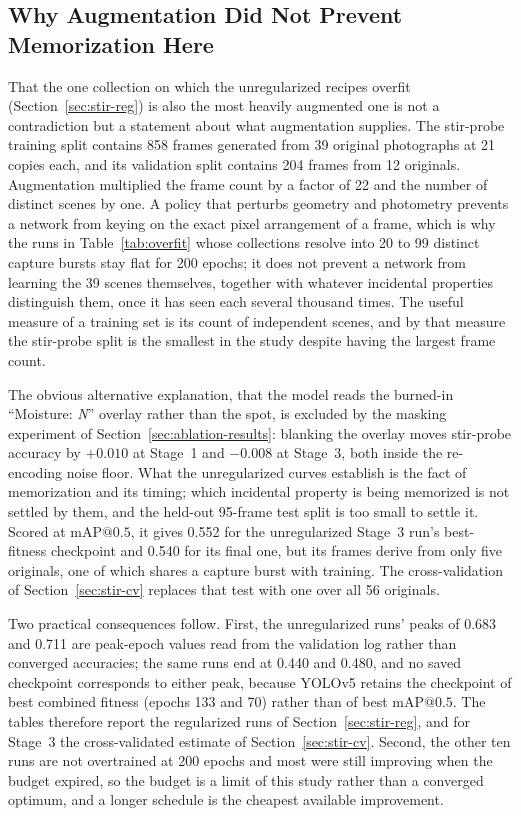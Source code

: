 ﻿\documentclass[journal]{IEEEtran}
\begin{document}
\subsection{Why Augmentation Did Not Prevent Memorization Here}
\label{sec:aug-limits}
That the one collection on which the unregularized recipes overfit (Section~\ref{sec:stir-reg}) is also the most heavily augmented one is not a contradiction but a statement about what augmentation supplies. The stir-probe training split contains 858 frames generated from 39 original photographs at 21 copies each, and its validation split contains 204 frames from 12 originals. Augmentation multiplied the frame count by a factor of 22 and the number of distinct scenes by one. A policy that perturbs geometry and photometry prevents a network from keying on the exact pixel arrangement of a frame, which is why the runs in Table~\ref{tab:overfit} whose collections resolve into 20 to 99 distinct capture bursts stay flat for 200 epochs; it does not prevent a network from learning the 39 scenes themselves, together with whatever incidental properties distinguish them, once it has seen each several thousand times. The useful measure of a training set is its count of independent scenes, and by that measure the stir-probe split is the smallest in the study despite having the largest frame count.

The obvious alternative explanation, that the model reads the burned-in ``Moisture: \emph{N}'' overlay rather than the spot, is excluded by the masking experiment of Section~\ref{sec:ablation-results}: blanking the overlay moves stir-probe accuracy by $+0.010$ at Stage~1 and $-0.008$ at Stage~3, both inside the re-encoding noise floor. What the unregularized curves establish is the fact of memorization and its timing; which incidental property is being memorized is not settled by them, and the held-out 95-frame test split is too small to settle it. Scored at $\text{mAP@0.5}$, it gives 0.552 for the unregularized Stage~3 run's best-fitness checkpoint and 0.540 for its final one, but its frames derive from only five originals, one of which shares a capture burst with training. The cross-validation of Section~\ref{sec:stir-cv} replaces that test with one over all 56 originals.

Two practical consequences follow. First, the unregularized runs' peaks of 0.683 and 0.711 are peak-epoch values read from the validation log rather than converged accuracies; the same runs end at 0.440 and 0.480, and no saved checkpoint corresponds to either peak, because YOLOv5 retains the checkpoint of best combined fitness (epochs 133 and 70) rather than of best $\text{mAP@0.5}$. The tables therefore report the regularized runs of Section~\ref{sec:stir-reg}, and for Stage~3 the cross-validated estimate of Section~\ref{sec:stir-cv}. Second, the other ten runs are not overtrained at 200 epochs and most were still improving when the budget expired, so the budget is a limit of this study rather than a converged optimum, and a longer schedule is the cheapest available improvement.
\end{document}
